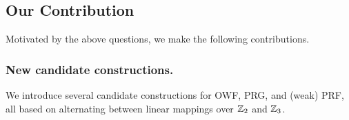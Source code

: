 
\subsection{Our Contribution}


Motivated by the above questions, we make the following contributions.

\iffalse
\paragraph{\bf \textnormal{OT} and \textnormal{VOLE} friendliness}.
    MPC protocols in the preprocessing modelcan take advantage of input-independent correlated randomness to better handle nonlinear gates~\cite{Beaver,BDOZ,SPDZ,PowerOfCorrelatedRandomness,TinyTables,BGI19}. However, some kinds of correlated randomness are better than other. Recent work~\cite{?} for instance, has shown how pseudorandom correlation generators (PCGs) can be used to generate millions of ``OT'' and ``VOLE'' correlations with very low and computation costs. Furthermore, it is not necessary to store all of these correlations; they can stored in a compressed form, and expanded only when needed~\cite{?}. Roughly speaking, an OT correlation is useful for evaluating a ``simple'' nonlinear gates (such as Boolean AND) and a VOLE correlation is useful for scalar-vector products. We would like to maximize the potential benefit from these recent techniques.


\mahimna{still writing}
\fi


\subsubsection{New candidate constructions.}
We introduce several candidate constructions for OWF, PRG, and (weak) PRF, all based on alternating between linear mappings over $\mathbb{Z}_2$ and $\mathbb{Z}_3$.

